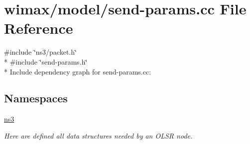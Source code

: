 \hypertarget{send-params_8cc}{}\section{wimax/model/send-\/params.cc File Reference}
\label{send-params_8cc}
{\ttfamily \#include \char`\"{}ns3/packet.\+h\char`\"{}}\\*
{\ttfamily \#include \char`\"{}send-\/params.\+h\char`\"{}}\\*
Include dependency graph for send-\/params.cc\+:
\subsection*{Namespaces}
\begin{DoxyCompactItemize}
\item 
 \hyperlink{namespacens3}{ns3}
\begin{DoxyCompactList}\small\item\em Here are defined all data structures needed by an O\+L\+SR node. \end{DoxyCompactList}\end{DoxyCompactItemize}
